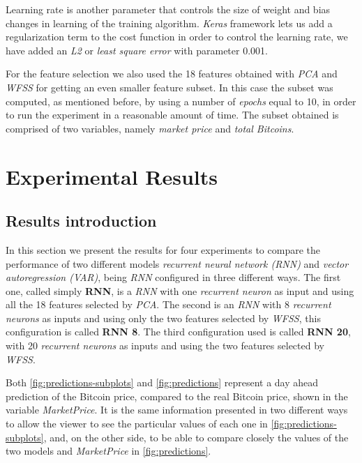 Learning rate is another parameter that controls the size of weight
and bias changes in learning of the training algorithm. \textit{Keras}
framework lets us add a regularization term to the cost function in
order to control the learning rate, we have added an \textit{L2} or
\textit{least square error} with parameter 0.001.


For the feature selection we also used the 18 features obtained with
\textit{PCA} and \textit{WFSS} for getting an even smaller feature
subset. In this case the subset was computed, as mentioned before, by
using a number of \textit{epochs} equal to 10, in order to run the
experiment in a reasonable amount of time. The subset obtained is
comprised of two variables, namely \textit{market price} and
\textit{total Bitcoins}.
\chapter{Experimental Results}
\label{ch:experimental-results}

\section{Results introduction}
\label{sec:result-presentation}

In this section we present the results for four experiments to compare
the performance of two different models \textit{recurrent neural
network (RNN)} and \textit{vector autoregression (VAR)}, being
\textit{RNN} configured in three different ways. The first one, called
simply \textbf{RNN}, is a \textit{RNN} with one \textit{recurrent
neuron} as input and using all the 18 features selected by
\textit{PCA}. The second is an \textit{RNN} with 8 \textit{recurrent
neurons} as inputs and using only the two features selected by
\textit{WFSS}, this configuration is called \textbf{RNN 8}. The third
configuration used is called \textbf{RNN 20}, with 20
\textit{recurrent neurons} as inputs and using the two features
selected by \textit{WFSS}.

Both \autoref{fig:predictions-subplots} and \autoref{fig:predictions}
represent a day ahead prediction of the Bitcoin price, compared to the
real Bitcoin price, shown in the variable \textit{MarketPrice}. It is
the same information presented in two different ways to allow the
viewer to see the particular values of each one in
\autoref{fig:predictions-subplots}, and, on the other side, to be able
to compare closely the values of the two models and
\textit{MarketPrice} in \autoref{fig:predictions}.

